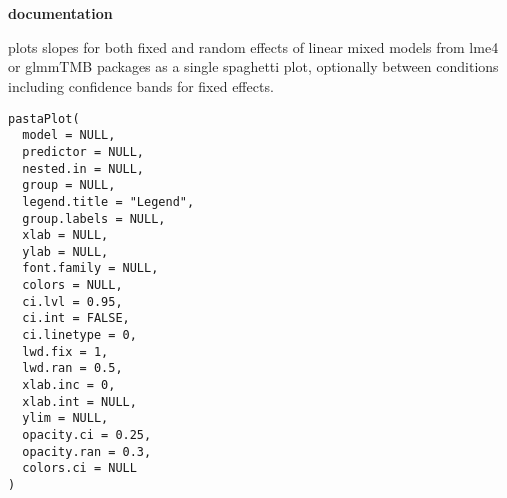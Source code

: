 \documentclass[a4paper]{book}
\begin{document}
\chapter*{}
\begin{center}
{\textbf{\huge \R{} documentation}} \par{}
\par\bigskip{\large \today}
\end{center}
%
\begin{Description}
 plots slopes for both fixed and random effects of linear mixed models from lme4 or glmmTMB packages as a single spaghetti plot, optionally between conditions including confidence bands for fixed effects.
\end{Description}
%
\begin{Usage}
\begin{verbatim}
pastaPlot(
  model = NULL,
  predictor = NULL,
  nested.in = NULL,
  group = NULL,
  legend.title = "Legend",
  group.labels = NULL,
  xlab = NULL,
  ylab = NULL,
  font.family = NULL,
  colors = NULL,
  ci.lvl = 0.95,
  ci.int = FALSE,
  ci.linetype = 0,
  lwd.fix = 1,
  lwd.ran = 0.5,
  xlab.inc = 0,
  xlab.int = NULL,
  ylim = NULL,
  opacity.ci = 0.25,
  opacity.ran = 0.3,
  colors.ci = NULL
)
\end{verbatim}
\end{Usage}
%
\end{document}
